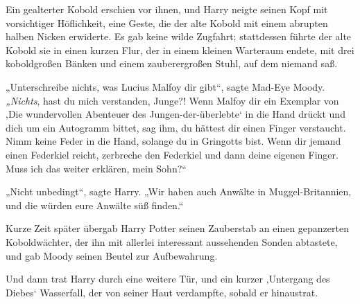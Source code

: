 Ein gealterter Kobold erschien vor ihnen, und Harry neigte seinen Kopf mit vorsichtiger Höflichkeit, eine Geste, die der alte Kobold mit einem abrupten halben Nicken erwiderte. Es gab keine wilde Zugfahrt; stattdessen führte der alte Kobold sie in einen kurzen Flur, der in einem kleinen Warteraum endete, mit drei koboldgroßen Bänken und einem zauberergroßen Stuhl, auf dem niemand saß.

„Unterschreibe nichts, was Lucius Malfoy dir gibt“, sagte Mad-Eye Moody. \emph{„Nichts}, hast du mich verstanden, Junge?! Wenn Malfoy dir ein Exemplar von ‚Die wundervollen Abenteuer des Jungen-der-überlebte‘ in die Hand drückt und dich um ein Autogramm bittet, sag ihm, du hättest dir einen Finger verstaucht. Nimm keine Feder in die Hand, solange du in Gringotts bist. Wenn dir jemand einen Federkiel reicht, zerbreche den Federkiel und dann deine eigenen Finger. Muss ich das weiter erklären, mein Sohn?“

„Nicht unbedingt“, sagte Harry.
„Wir haben auch Anwälte in Muggel-Britannien, und die würden eure Anwälte süß finden.“

Kurze Zeit später übergab Harry Potter seinen Zauberstab an einen gepanzerten Koboldwächter, der ihn mit allerlei interessant aussehenden Sonden abtastete, und gab Moody seinen Beutel zur Aufbewahrung.

Und dann trat Harry durch eine weitere Tür, und ein kurzer ‚Untergang des Diebes‘ Wasserfall, der von seiner Haut verdampfte, sobald er hinaustrat.

